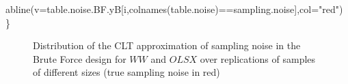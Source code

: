 \documentclass[
]{book}
\newenvironment{Shaded}{\begin{snugshade}}{\end{snugshade}}
\newcommand{\AttributeTok}[1]{\textcolor[rgb]{0.77,0.63,0.00}{#1}}
\newcommand{\FunctionTok}[1]{\textcolor[rgb]{0.00,0.00,0.00}{#1}}
\newcommand{\NormalTok}[1]{#1}
\newcommand{\SpecialCharTok}[1]{\textcolor[rgb]{0.00,0.00,0.00}{#1}}
\newcommand{\StringTok}[1]{\textcolor[rgb]{0.31,0.60,0.02}{#1}}
\theoremstyle{definition}
\theoremstyle{definition}
\theoremstyle{definition}
\theoremstyle{definition}
\theoremstyle{remark}
\begin{document}
\begin{Shaded}
\begin{Highlighting}[]
  \FunctionTok{abline}\NormalTok{(}\AttributeTok{v=}\NormalTok{table.noise.BF.yB[i,}\FunctionTok{colnames}\NormalTok{(table.noise)}\SpecialCharTok{==}\StringTok{\textquotesingle{}sampling.noise\textquotesingle{}}\NormalTok{],}\AttributeTok{col=}\StringTok{"red"}\NormalTok{)}
\NormalTok{\}}
\end{Highlighting}
\end{Shaded}

\begin{figure}[htbp]

{\centering {}

}

\caption{Distribution of the CLT approximation of sampling noise in the Brute Force design for $WW$ and $OLSX$ over replications of samples of different sizes (true sampling noise in red)}\label{fig:sampnoisewwBFCLTall}
\end{figure}
\end{document}
